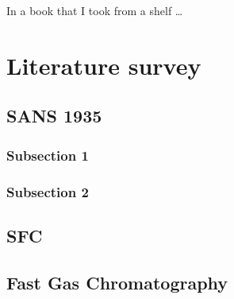 
\begin{savequote}[45mm]
In a book that I took from a shelf \ldots
{}
\end{savequote}


\chapter{Literature survey} %

\label{Chapter3} %


\section{SANS 1935}

\subsection{Subsection 1}

\subsection{Subsection 2}

\section{SFC}

\section{Fast Gas Chromatography}

